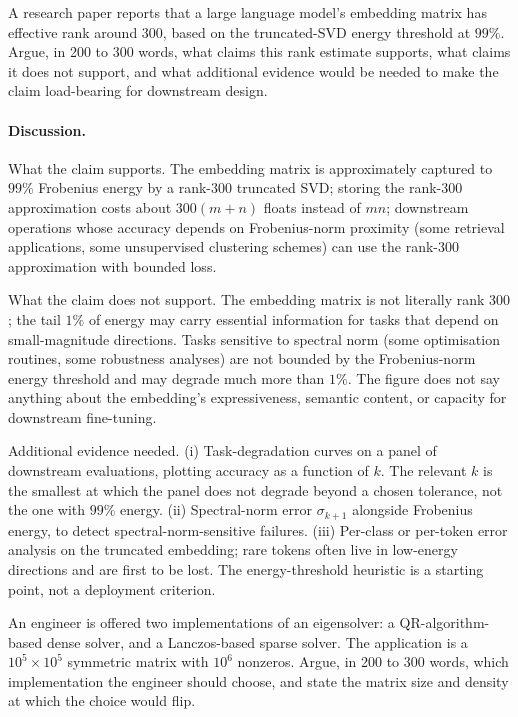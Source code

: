 \begin{exercise}
A research paper reports that a large language model's
embedding matrix has effective rank around $300$, based on the
truncated-SVD energy threshold at $99\%$. Argue, in 200 to 300
words, what claims this rank estimate supports, what claims it does
not support, and what additional evidence would be needed to make
the claim load-bearing for downstream design.
\end{exercise}

\paragraph{Discussion.}
What the claim supports. The embedding matrix is approximately
captured to $99\%$ Frobenius energy by a rank-$300$ truncated SVD;
storing the rank-$300$ approximation costs about $300 (m + n)$
floats instead of $mn$; downstream operations whose accuracy
depends on Frobenius-norm proximity (some retrieval applications,
some unsupervised clustering schemes) can use the rank-$300$
approximation with bounded loss.

What the claim does not support. The embedding matrix is not
literally rank $300$; the tail $1\%$ of energy may carry essential
information for tasks that depend on small-magnitude directions.
Tasks sensitive to spectral norm (some optimisation routines, some
robustness analyses) are not bounded by the Frobenius-norm energy
threshold and may degrade much more than $1\%$. The figure does not
say anything about the embedding's expressiveness, semantic
content, or capacity for downstream fine-tuning.

Additional evidence needed. (i) Task-degradation curves on a panel
of downstream evaluations, plotting accuracy as a function of $k$.
The relevant $k$ is the smallest at which the panel does not
degrade beyond a chosen tolerance, not the one with $99\%$ energy.
(ii) Spectral-norm error $\sigma_{k+1}$ alongside Frobenius energy,
to detect spectral-norm-sensitive failures. (iii) Per-class or
per-token error analysis on the truncated embedding; rare tokens
often live in low-energy directions and are first to be lost. The
energy-threshold heuristic is a starting point, not a deployment
criterion.

\begin{exercise}
An engineer is offered two implementations of an eigensolver: a
QR-algorithm-based dense solver, and a Lanczos-based sparse solver.
The application is a $10^{5} \times 10^{5}$ symmetric matrix
with $10^{6}$ nonzeros. Argue, in 200 to 300 words, which
implementation the engineer should choose, and state the matrix
size and density at which the choice would flip.
\end{exercise}

